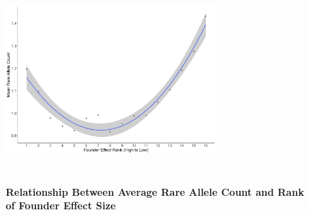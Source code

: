 \documentclass[article,9pt,twocolumn,twoside]{rilabRxiv}
\begin{document}
\begin{figure}[!ht]
\centering
\includegraphics[width=0.7\textwidth,height=3in]{figures/smile_beta_rank_plot.png}
\caption{\textbf{Relationship Between Average Rare Allele Count and Rank of Founder Effect Size}}
\label{fig:chapter2_supfigure7}
\end{figure}
\end{document}
